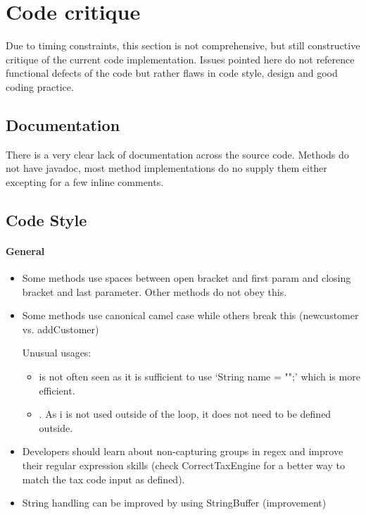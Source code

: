 \pagebreak
\section{Code critique}
\label{app:code-critique}

Due to timing constraints, this section is not comprehensive, but still constructive critique of the current code implementation. Issues pointed here do not reference functional defects of the code but rather flaws in code style, design and good coding practice. 

\subsection{Documentation}
There is a very clear lack of documentation across the source code. Methods do not have javadoc, most method implementations do no supply them either excepting for a few inline comments. 

\subsection{Code Style}

\paragraph{General}
\begin{itemize}
    \item Some methods use spaces between open bracket and first param and closing bracket and last parameter. Other methods do not obey this. 
    \item Some methods use canonical camel case while others break this (newcustomer vs. addCustomer)

    Unusual usages: 
    \begin{itemize}
        \item {} is not often seen as it is sufficient to use `String name = "";' which is more efficient. 
        \item {}. As i is not used outside of the loop, it does not need to be defined outside. 
    \end{itemize}

    \item Developers should learn about non-capturing groups in regex and improve their regular expression skills (check CorrectTaxEngine for a better way to match the tax code input as defined).

    \item String handling can be improved by using StringBuffer (improvement)
    
\end{itemize}    

